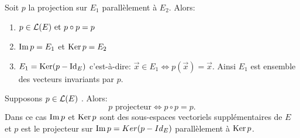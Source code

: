 \documentclass{book}
\begin{document}
\begin{Proposition}[Propriétés] Soit $p$ la projection sur $E_1$ parallèlement à $E_2$. Alors:
\begin{enumerate}
\item $p \in   \mathcal{L}(E)\text{ et }p \circ p = p$
\item $\operatorname{Im} p = E_1$ et $\operatorname{Ker} p = E_2$
\item $E_1 = \operatorname{Ker}(p - \mathrm{Id}_E)$ c'est-à-dire: $\vec{ x }\in   E_1 \Leftrightarrow p(\vec{x}) = \vec{x}.$ Ainsi $E_1$ est ensemble des vecteurs invariants par $p$.
\end{enumerate}
\end{Proposition}
\begin{Proposition}[Caractérisation] Supposons $p \in   \mathcal{L}(E)$ . Alors:
$$p\text{ projecteur} \Leftrightarrow p \circ p = p.$$
Dans ce cas $\operatorname{Im} p$ et $\operatorname{Ker} p$ sont des sous-espaces vectoriels supplémentaires de $E$ et $p$ est le projecteur sur $\operatorname{Im} p =
Ker(p - Id_E)$ parallèlement à $\operatorname{Ker} p$.
\end{Proposition}
%
%
%
%
\end{document}
